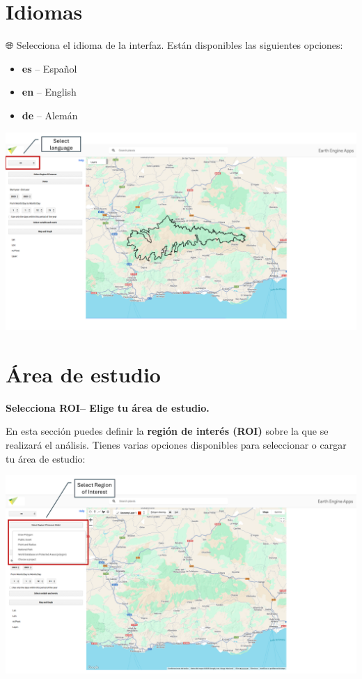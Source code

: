 \documentclass[
]{book}
\begin{document}
\chapter{Idiomas}\label{idiomas}

🌐 Selecciona el idioma de la interfaz. Están disponibles las siguientes opciones:

\begin{itemize}
\item
  \textbf{es} -- Español
\item
  \textbf{en} -- English
\item
  \textbf{de} -- Alemán
\end{itemize}

\includegraphics{assets/Language.png}

\chapter{Área de estudio}\label{area-estudio}

\textbf{Selecciona ROI-- Elige tu área de estudio.}

En esta sección puedes definir la \textbf{región de interés (ROI)} sobre la que se realizará el análisis. Tienes varias opciones disponibles para seleccionar o cargar tu área de estudio:

\includegraphics{assets/ROI.png}
\end{document}
